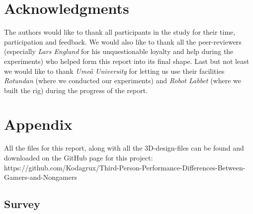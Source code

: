 \documentclass[runningheads,a4paper,oribibl]{llncs}
\begin{document}
\section{Acknowledgments}
The authors would like to thank all participants in the study for their time, participation and feedback. We would also like to thank all the peer-reviewers (especially \emph{Lars Englund} for his unquestionable loyalty and help during the experiments) who helped form this report into its final shape. Last but not least we would like to thank \emph{Umeå University} for letting us use their facilities \emph{Rotundan} (where we conducted our experiments) and \emph{Robot Labbet} (where we built the rig) during the progress of the report.








%



\appendix

\section{Appendix}
All the files for this report, along with all the 3D-design-files can be found and downloaded on the GitHub page for this project: https://github.com/Kodagrux/Third-Person-Performance-Differences-Between-Gamers-and-Nongamers 
\subsection{Survey} \label{subsec:Survey}

\end{document}

